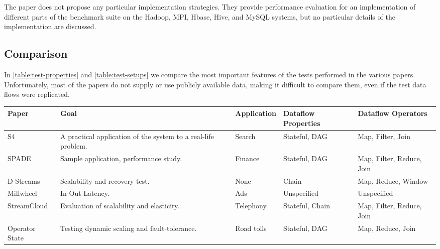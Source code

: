 The paper does not propose any particular implementation strategies. They provide performance evaluation for an implementation of different parts of the benchmark suite on the Hadoop, MPI, Hbase, Hive, and MySQL systems, but no particular details of the implementation are discussed.

\subsection{Comparison}
In \autoref{table:test-properties} and \autoref{table:test-setups} we compare the most important features of the tests performed in the various papers. Unfortunately, most of the papers do not supply or use publicly available data, making it difficult to compare them, even if the test data flows were replicated.

\begin{table}[H]
  \centering
  {
    \scriptsize
    \hspace*{-1cm}
    \begin{tabular}{|p{3cm}|p{4cm}|p{3cm}|p{2.5cm}|p{2.5cm}|}
      \hline
      Paper & Goal & Application & Dataflow Properties & Dataflow Operators
      \\\hline
      
      S4\cite{s4}
      & A practical application of the system to a real-life problem.
      & Search
      & Stateful, DAG
      & Map, Filter, Join
      \\\hline
      
      SPADE\cite{spade}
      & Sample application, performance study.
      & Finance
      & Stateful, DAG
      & Map, Filter, Reduce, Join
      \\\hline

      D-Streams\cite{discretized}
      & Scalability and recovery test.
      & None
      & Chain
      & Map, Reduce, Window
      \\\hline

      Millwheel\cite{millwheel}
      & In-Out Latency.
      & Ads
      & Unspecified
      & Unspecified
      \\\hline

      StreamCloud\cite{streamcloud}
      & Evaluation of scalability and elasticity.
      & Telephony
      & Stateful, Chain
      & Map, Filter, Reduce, Join
      \\\hline

      Operator State\cite{integrating}
      & Testing dynamic scaling and fault-tolerance.
      & Road tolls
      & Stateful, DAG
      & Map, Reduce, Join
      \\\hline


\end{tabular}}
\end{table}
